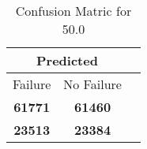 \begin{table}[] 
\label{Table: Prediction Accuracy-DMD50.0OnlySunEKF-combinationReflection-Reflection} 
\caption{Confusion Matric for 50.0} 
\centering 
\begin{tabular} 
 {@{}ccc@{}} 
\toprule 
\multicolumn{2}{c}{\textbf{Predicted}}
 \\ \midrule 
\multicolumn{1}{|c|}{Failure} & 
\multicolumn{1}{c|}{No Failure}
 \\ \midrule 
\multicolumn{1}{|c|}{\color{green}\textbf{61771}} & 
\multicolumn{1}{c|}{\color{green}\textbf{61460}}
 \\ \midrule 
\multicolumn{1}{|c|}{\color{red}\textbf{23513}} & 
\multicolumn{1}{c|}{\color{red}\textbf{23384}}
 \\ \bottomrule 
\end{tabular} 
\end{table} 
